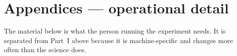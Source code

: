 \documentclass[11pt,a4paper]{article}
\begin{document}


\tableofcontents
\newpage





\newpage



\newpage


\appendix
\newpage
\section*{Appendices --- operational detail}

\noindent
The material below is what the person running the experiment needs. It is
separated from Part~I above because it is machine-specific and changes more
often than the science does.





\end{document}
